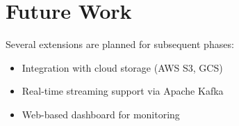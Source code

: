 \chapter{Future Work}

Several extensions are planned for subsequent phases:
\begin{itemize}
    \item Integration with cloud storage (AWS S3, GCS)
    \item Real-time streaming support via Apache Kafka
    \item Web-based dashboard for monitoring
\end{itemize}
